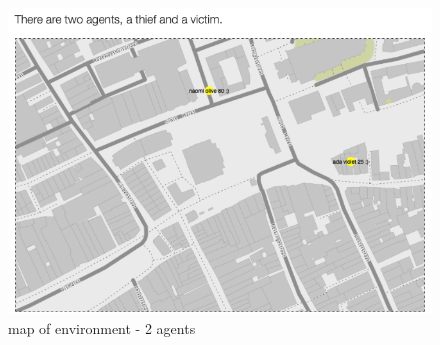 \begin{figure}[htbp]
\begin{center}
\includegraphics[width=\linewidth]{images/grotemarktmap.png}
\caption{map of environment - 2 agents}
\label{groteMarkt}
\end{center}
\end{figure}



